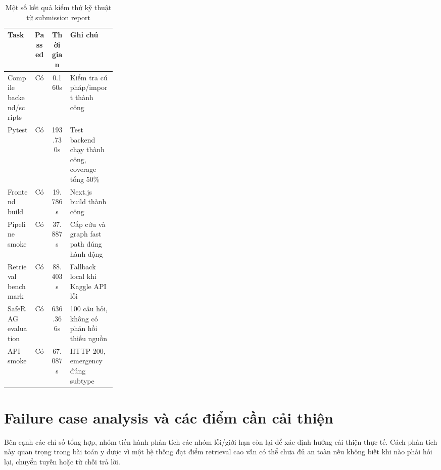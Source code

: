 \begin{table}[H]
\centering
\small
\caption{Một số kết quả kiểm thử kỹ thuật từ submission report}
\begin{tabularx}{\linewidth}{p{0.25\linewidth} C C Y}
\toprule
\textbf{Task} & \textbf{Passed} & \textbf{Thời gian} & \textbf{Ghi chú} \\
\midrule
Compile backend/scripts & Có & 0.160s & Kiểm tra cú pháp/import thành công \\
Pytest & Có & 193.730s & Test backend chạy thành công, coverage tổng 50\% \\
Frontend build & Có & 19.786s & Next.js build thành công \\
Pipeline smoke & Có & 37.887s & Cấp cứu và graph fast path đúng hành động \\
Retrieval benchmark & Có & 88.403s & Fallback local khi Kaggle API lỗi \\
SafeRAG evaluation & Có & 636.366s & 100 câu hỏi, không có phản hồi thiếu nguồn \\
API smoke & Có & 67.087s & HTTP 200, emergency đúng subtype \\
\bottomrule
\end{tabularx}
\end{table}

\section{Failure case analysis và các điểm cần cải thiện}

Bên cạnh các chỉ số tổng hợp, nhóm tiến hành phân tích các nhóm lỗi/giới hạn còn lại để xác định hướng cải thiện thực tế. Cách phân tích này quan trọng trong bài toán y dược vì một hệ thống đạt điểm retrieval cao vẫn có thể chưa đủ an toàn nếu không biết khi nào phải hỏi lại, chuyển tuyến hoặc từ chối trả lời.

